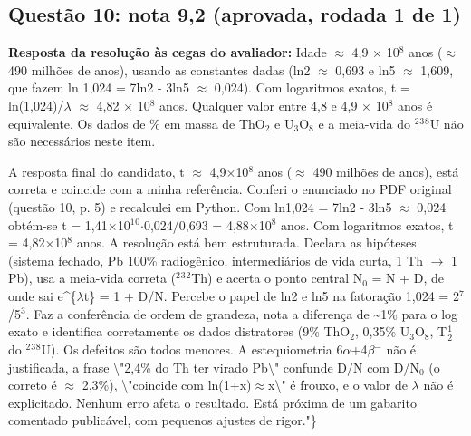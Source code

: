 \documentclass{article}%
\begin{document}
\subsection*{Questão 10: nota 9,2 (aprovada, rodada 1 de 1)}%
\textbf{Resposta da resolução às cegas do avaliador:} Idade $\approx$ 4,9 $\times$ 10$^{8}$ anos ($\approx$ 490 milhões de anos), usando as constantes dadas (ln2 $\approx$ 0,693 e ln5 $\approx$ 1,609, que fazem ln 1,024 = 7ln2 - 3ln5 $\approx$ 0,024). Com logaritmos exatos, t = ln(1,024)/$\lambda$ $\approx$ 4,82 $\times$ 10$^{8}$ anos. Qualquer valor entre 4,8 e 4,9 $\times$ 10$^{8}$ anos é equivalente. Os dados de \% em massa de ThO$_{2}$ e U$_{3}$O$_{8}$ e a meia{-}vida do $^2$$^3$$^{8}$U não são necessários neste item.\par %
A resposta final do candidato, t $\approx$ 4,9$\times$10$^{8}$ anos ($\approx$ 490 milhões de anos), está correta e coincide com a minha referência. Conferi o enunciado no PDF original (questão 10, p. 5) e recalculei em Python. Com ln1,024 = 7ln2 - 3ln5 $\approx$ 0,024 obtém{-}se t = 1,41$\times$10$^{1}$$^{0}$$\cdot$0,024/0,693 = 4,88$\times$10$^{8}$ anos. Com logaritmos exatos, t = 4,82$\times$10$^{8}$ anos. A resolução está bem estruturada. Declara as hipóteses (sistema fechado, Pb 100\% radiogênico, intermediários de vida curta, 1 Th $\to$ 1 Pb), usa a meia{-}vida correta ($^2$$^3$$^2$Th) e acerta o ponto central N$_{0}$ = N + D, de onde sai e\^{}\{$\lambda$t\} = 1 + D/N. Percebe o papel de ln2 e ln5 na fatoração 1,024 = 2$^{7}$/5$^3$. Faz a conferência de ordem de grandeza, nota a diferença de \textasciitilde{}1\% para o log exato e identifica corretamente os dados distratores (9\% ThO$_{2}$, 0,35\% U$_{3}$O$_{8}$, T$\frac12$ do $^2$$^3$$^{8}$U). Os defeitos são todos menores. A estequiometria 6$\alpha$+4$\beta$$^{-}$ não é justificada, a frase \textbackslash{}"2,4\% do Th ter virado Pb\textbackslash{}" confunde D/N com D/N$_{0}$ (o correto é $\approx$ 2,3\%), \textbackslash{}"coincide com ln(1+x)$\approx$x\textbackslash{}" é frouxo, e o valor de $\lambda$ não é explicitado. Nenhum erro afeta o resultado. Está próxima de um gabarito comentado publicável, com pequenos ajustes de rigor."\}%
$$
\end{document}
